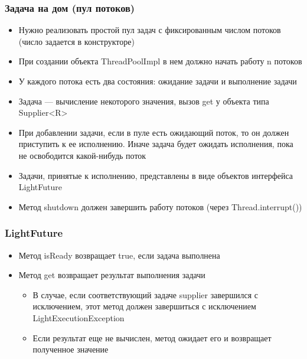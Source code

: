 \documentclass[xetex,mathserif,serif]{beamer}
\begin{document}
	\begin{frame}
		\frametitle{Задача на дом (пул потоков)}
		\begin{itemize}
			\item Нужно реализовать простой пул задач с фиксированным числом потоков (число задается в конструкторе)
			\item При создании объекта ThreadPoolImpl в нем должно начать работу n потоков
			\item У каждого потока есть два состояния: ожидание задачи и выполнение задачи
			\item Задача --- вычисление некоторого значения, вызов get у объекта типа Supplier<R>
			\item При добавлении задачи, если в пуле есть ожидающий поток, то он должен приступить к ее исполнению. 
					Иначе задача будет ожидать исполнения, пока не освободится какой-нибудь поток
			\item Задачи, принятые к исполнению, представлены в виде объектов интерфейса LightFuture
			\item Метод shutdown должен завершить работу потоков (через Thread.interrupt())
		\end{itemize}
	\end{frame}

	\begin{frame}
		\frametitle{LightFuture}
		\begin{itemize}
			\item Метод isReady возвращает true, если задача выполнена
			\item Метод get возвращает результат выполнения задачи
			\begin{itemize}
				\item В случае, если соответствующий задаче supplier завершился с исключением, этот метод должен завершиться с исключением LightExecutionException
				\item Если результат еще не вычислен, метод ожидает его и возвращает полученное значение
			\end{itemize}
		\end{itemize}
	\end{frame}
\end{document}
